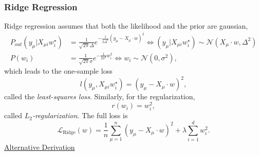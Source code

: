 \documentclass{article}
\begin{document}
\subsubsection*{Ridge Regression}
Ridge regression assumes that both the likelihood and the prior are gaussian,
\begin{align}
    P_{out} (y_{\mu} | X_{\mu i} w^{\star}_i)
    &=
    \frac{1}{\sqrt{2\pi}\Delta}e^{-\frac{1}{2\Delta^2} (y_{\mu} - X_{\mu} \cdot w)^2}
    \iff \left(y_{\mu} | X_{\mu i} w^{\star}_i\right) \sim \mathcal{N}(X_{\mu}\cdot w,\Delta^2) \\
    P(w_i) &=
    \frac{1}{\sqrt{2\pi}\sigma}e^{-\frac{1}{2\sigma^2}w_i^2}
    \iff w_i \sim \mathcal{N}(0,\sigma^2),
\end{align}
which leads to the one-sample loss
\begin{equation}
    l(y_{\mu}, X_{\mu i} w^{\star}_i)
    =
    (y_{\mu} - X_{\mu} \cdot w)^2,
\end{equation}
called the \emph{least-squares loss}. Similarly, for the regularization,
\begin{equation}
    r(w_i)
    =
    w_i^2,
\end{equation}
called \emph{$L_2$-regularization}. The full loss is
\begin{equation}
    \mathcal{L}_{\text{Ridge}}(w)
    =
    \frac{1}{n}\sum_{\mu = 1}^{n} (y_{\mu} - X_{\mu} \cdot w)^2
    +
    \lambda \sum_{i=1}^{d} w_i^2.
\end{equation}
\underline{Alternative Derivation}
\end{document}

